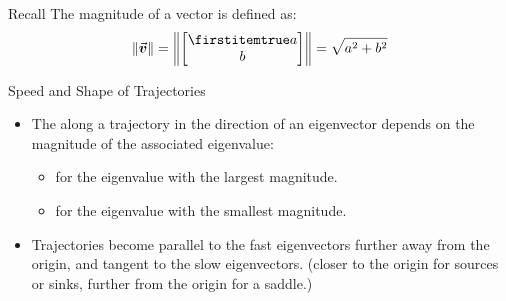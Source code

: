 \documentclass{beamer}
\begin{document}
\begin{frame}
\onslide<+->
\begin{block}{Recall}
The magnitude of a vector is defined as:
\begin{equation*}
\vabs{\vect{v}}=\vabs{\bvector{a,b}}=\sqrt{a^2+b^2}
\end{equation*}
\end{block}
\onslide<+->
\begin{block}{Speed and Shape of Trajectories}
\begin{itemize}[<+- | alert@+>]
\item The  along a trajectory in the direction of an eigenvector depends on the magnitude of the associated eigenvalue:
\begin{itemize}
\item {} for the eigenvalue with the largest magnitude.
\item {} for the eigenvalue with the smallest magnitude.
\end{itemize}
\item Trajectories become parallel to the fast eigenvectors further away from the origin, and tangent to the slow eigenvectors. (closer to the origin for sources or sinks, further from the origin for a saddle.)
\end{itemize}
\end{block}
\end{frame}
\end{document}
